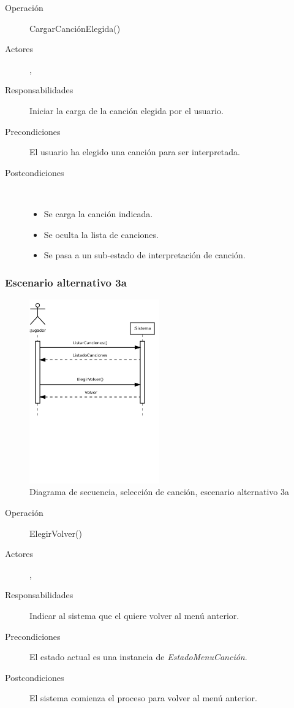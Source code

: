 \begin{description}
\item[Operación] CargarCanciónElegida()
\item[Actores] \jugador, \sistema
\item[Responsabilidades] Iniciar la carga de la canción elegida por el usuario.
\item[Precondiciones] El usuario ha elegido una canción para ser interpretada.
\item[Postcondiciones] $\quad$
  \begin{itemize}
  \item Se carga la canción indicada.
  \item Se oculta la lista de canciones.
  \item Se pasa a un sub-estado de interpretación de canción.
  \end{itemize}
\end{description}

\subsubsection{Escenario alternativo 3a}
\begin{figure}[h!]
  \centering
  \includegraphics[trim=0cm 10cm 0cm 0cm, clip=true, width=0.5\textwidth]{4_analisis/diagsec_caso2_esc2}
  \caption{Diagrama de secuencia, selección de canción, escenario alternativo 3a}
\end{figure}
\begin{description}
\item[Operación] ElegirVolver()
\item[Actores] \jugador, \sistema
\item[Responsabilidades] Indicar al sistema que el \jugador quiere volver al
  menú anterior.
\item[Precondiciones] El estado actual es una instancia de \textit{EstadoMenuCanción}.
\item[Postcondiciones] El sistema comienza el proceso para volver al menú anterior.
\end{description}

